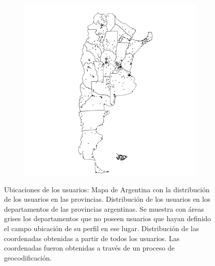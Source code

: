 \begin{figure}[!ht]
\begin{subfigure}[t]{0.31\textwidth}
    \caption{} 
    \label{fig:mapaDepartamentos} 
   \end{subfigure}
   \begin{subfigure}[t]{0.31\textwidth}
    \includegraphics[width=\linewidth]{./images/mapaprovinciasConPuntos.pdf}
    \caption{} 
    \label{fig:mapaPuntos} 
   \end{subfigure}
   



   \caption{Ubicaciones de los usuarios:  Mapa de Argentina con la distribución de los usuarios en las provincias.  Distribución de los usuarios en los departamentos de las provincias argentinas. Se muestra con áreas grises los departamentos que no poseen usuarios que hayan definido el campo ubicación de su perfil en ese lugar.  Distribución de las coordenadas obtenidas a partir de todos los usuarios. Las coordenadas fueron obtenidas a través de un proceso de geocodificación. } 
  \label{fig:busqueda_usuarios} 

\end{figure}

